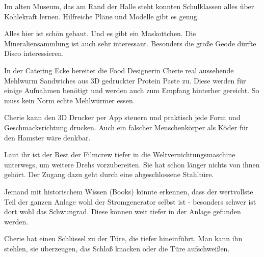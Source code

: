 Im alten Museum, das am Rand der Halle steht konnten Schulklassen alles über Kohlekraft lernen. Hilfreiche Pläne und Modelle gibt es genug.

Alles hier ist schön gebaut. Und es gibt ein Maskottchen. Die Mineraliensammlung ist auch sehr interessant. Besonders die große Geode dürfte Disco interessieren.

In der Catering Ecke bereitet die Food Designerin Cherie real aussehende Mehlwurm Sandwiches aus 3D gedruckter Protein Paste zu. Diese werden für einige Aufnahmen benötigt und werden auch zum Empfang hinterher gereicht. So muss kein Norm echte Mehlwürmer essen.

Cherie kann den 3D Drucker per App steuern und praktisch jede Form und Geschmacksrichtung drucken. Auch ein falscher Menschenkörper als Köder für den Hamster wäre denkbar.

Laut ihr ist der Rest der Filmcrew tiefer in die Weltvernichtungsmaschine unterwegs, um weitere Drehs vorzubereiten. Sie hat schon länger nichts von ihnen gehört. Der Zugang dazu geht durch eine abgeschlossene Stahltüre.

Jemand mit historischem Wissen (Books) könnte erkennen, dass der wertvollste Teil der ganzen Anlage wohl der Stromgenerator selbst ist - besonders schwer ist dort wohl das Schwungrad. Diese können weit tiefer in der Anlage gefunden werden.

Cherie hat einen Schlüssel zu der Türe, die tiefer hineinführt. Man kann ihn stehlen, sie überzeugen, das Schloß knacken oder die Türe aufschweißen.


